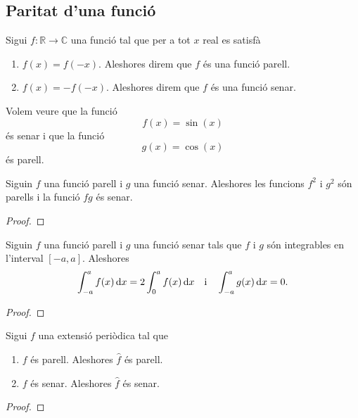 \documentclass[../../Main.tex]{subfiles}
\begin{document}
	\subsection{Paritat d'una funció}
	\begin{definition}
		\label{def:funció parell}
		\label{def:funció senar}
		Sigui \(f\colon\mathbb{R}\longrightarrow\mathbb{C}\) una funció tal que per a tot \(x\) real es satisfà
		\begin{enumerate}
			\item \(f(x)=f(-x)\). Aleshores direm que \(f\) és una funció parell.
			\item \(f(x)=-f(-x)\). Aleshores direm que \(f\) és una funció senar.
		\end{enumerate}
	\end{definition}
	\begin{example}
		\label{ex:el sinus és una funció senar}
		\label{ex:el cosinus és una funció parell}
		Volem veure que la funció
		\[f(x)=\sin(x)\]
		és senar i que la funció
		\[g(x)=\cos(x)\]
		és parell.
		\begin{solution}
		\end{solution}
	\end{example}
	\begin{proposition}
		\label{prop:la paritat de funcions es comporta com el producte de signes}
		Siguin \(f\) una funció parell i \(g\) una funció senar. Aleshores les funcions \(f^{2}\) i \(g^{2}\) són parells i la funció \(fg\) és senar.
		\begin{proof}
		\end{proof}
	\end{proposition}
	\begin{proposition}
		\label{prop:la integral d'una funció parell en un interval simètric és el doble que en mig interval}
		\label{prop:la integral d'una funció senar en un interval simètric és 0}
		Siguin \(f\) una funció parell i \(g\) una funció senar tals que \(f\) i \(g\) són integrables en l'interval \([-a,a]\). Aleshores
		\[\int_{-a}^{a}f(x)\mathop{}\!\mathrm{d} x=2\int_{0}^{a}f(x)\mathop{}\!\mathrm{d} x\quad\text{i}\quad\int_{-a}^{a}g(x)\mathop{}\!\mathrm{d} x=0.\]
		\begin{proof}
		\end{proof}
	\end{proposition}
	\begin{lemma}
		\label{lema:la paritat d'una funció es conserva en els coeficients de fourier}
		Sigui \(f\) una extensió periòdica tal que
		\begin{enumerate}
			\item \(f\) és parell. Aleshores \(\widehat{f}\) és parell.
			\item \(f\) és senar. Aleshores \(\widehat{f}\) és senar.
		\end{enumerate}
		\begin{proof}
		\end{proof}
	\end{lemma}
\end{document}
